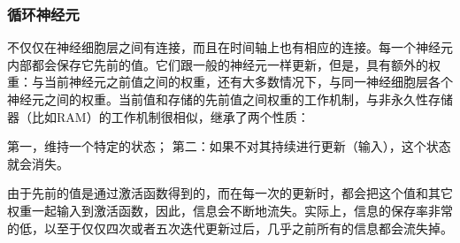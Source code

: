 \subsubsection{循环神经元}

不仅仅在神经细胞层之间有连接，而且在时间轴上也有相应的连接。每一个神经元内部都会保存它先前的值。它们跟一般的神经元一样更新，但是，具有额外的权重：与当前神经元之前值之间的权重，还有大多数情况下，与同一神经细胞层各个神经元之间的权重。当前值和存储的先前值之间权重的工作机制，与非永久性存储器（比如RAM）的工作机制很相似，继承了两个性质：

    第一，维持一个特定的状态；
    第二：如果不对其持续进行更新（输入），这个状态就会消失。

    由于先前的值是通过激活函数得到的，而在每一次的更新时，都会把这个值和其它权重一起输入到激活函数，因此，信息会不断地流失。实际上，信息的保存率非常的低，以至于仅仅四次或者五次迭代更新过后，几乎之前所有的信息都会流失掉。
